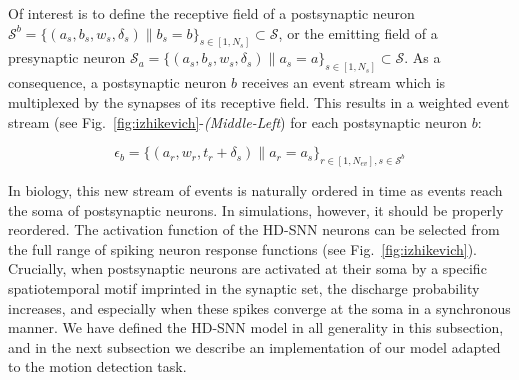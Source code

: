 \documentclass[default]{sn-jnl}%
\theoremstyle{thmstyleone}%
\theoremstyle{thmstyletwo}%
\theoremstyle{thmstylethree}%
\newcommand{\seeFig}[1]{see Fig.~\ref{fig:#1}}%
\newcommand{\presynaddr}{a} %
\newcommand{\postsynaddr}{b} %
\newcommand{\numevent}{N_{ev}} %
\newcommand{\arank}{r} %
\newcommand{\synapse}{\mathcal{S}} %
\newcommand{\synapticweight}{w} %
\newcommand{\synapticdelay}{\delta} %
\newcommand{\ranksyn}{s} %
\newcommand{\Nsyn}{N_{s}} %
\newcommand{\timev}{t} %
\newcommand{\event}{\epsilon} %
\begin{document}
Of interest is to define the receptive field of a postsynaptic neuron $\synapse^\postsynaddr =  \{(\presynaddr_\ranksyn, \postsynaddr_\ranksyn, \synapticweight_\ranksyn, \synapticdelay_\ranksyn) \| \postsynaddr_\ranksyn=\postsynaddr\}_{\ranksyn \in [1,\Nsyn]}  \subset \synapse$, or the emitting field of a presynaptic neuron $\synapse_\presynaddr = \{(\presynaddr_\ranksyn, \postsynaddr_\ranksyn, \synapticweight_\ranksyn, \synapticdelay_\ranksyn) \| \presynaddr_\ranksyn=\presynaddr\}_{\ranksyn \in [1,\Nsyn]} \subset \synapse$. As a consequence, a postsynaptic neuron $\postsynaddr$ receives an event stream which is multiplexed by the synapses of its receptive field. This results in a weighted event stream (\seeFig{izhikevich}-\textit{(Middle-Left}) for each  postsynaptic neuron $\postsynaddr$: 
%
\begin{linenomath*}
\begin{equation}\label{eq:stream_b}
\event_\postsynaddr = \{(\presynaddr_\arank, \synapticweight_\arank, \timev_\arank+\synapticdelay_\ranksyn) \| \presynaddr_\arank = \presynaddr_\ranksyn \}_{\arank \in [1,\numevent], \ranksyn \in \synapse^\postsynaddr}
\end{equation}
\end{linenomath*}
%
In biology, this new stream of events is naturally ordered in time as events reach the soma of postsynaptic neurons. In simulations, however, it should be properly reordered. The activation function of the HD-SNN neurons can be selected from the full range of spiking neuron response functions (\seeFig{izhikevich}). Crucially, when postsynaptic neurons are activated at their soma by a specific spatiotemporal motif imprinted in the synaptic set, the discharge probability increases, and especially when these spikes converge at the soma in a synchronous manner. We have defined the HD-SNN model in all generality in this subsection, and in the next subsection we describe an implementation of our model adapted to the motion detection task. 
%
\end{document}
